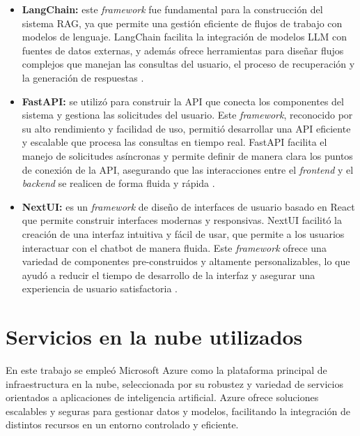 \begin{itemize}
	\item \textbf{LangChain:} este \textit{framework} fue fundamental para la construcción del sistema RAG, ya que permite una gestión 
	eficiente de flujos de trabajo con modelos de lenguaje. LangChain facilita la integración de modelos LLM con fuentes de datos externas, 
	y además ofrece herramientas para diseñar flujos complejos 
	que manejan las consultas del usuario, el proceso de recuperación y la generación de respuestas \citep{website:langchain}.
	\item \textbf{FastAPI:} se utilizó para construir la API que conecta los componentes del sistema y gestiona las solicitudes del usuario. 
	Este \textit{framework}, reconocido por su alto rendimiento y facilidad de uso, permitió desarrollar una API eficiente y escalable que procesa 
	las consultas en tiempo real. FastAPI facilita el manejo de solicitudes asíncronas y permite definir de manera clara los puntos 
	de conexión de la API, asegurando que las interacciones entre el \textit{frontend} y el \textit{backend} se 
	realicen de forma fluida y rápida \citep{website:fastapi}.
	\item \textbf{NextUI:} es un \textit{framework} de diseño de interfaces de usuario 
	basado en React que permite construir interfaces modernas y responsivas. NextUI facilitó la creación de una interfaz intuitiva 
	y fácil de usar, que permite a los usuarios interactuar con el chatbot de manera fluida. Este \textit{framework} ofrece una variedad de 
	componentes pre-construidos y altamente personalizables, lo que ayudó a reducir el tiempo de desarrollo de la interfaz y asegurar 
	una experiencia de usuario satisfactoria \citep{website:nextui}.
\end{itemize}

\section{Servicios en la nube utilizados}

En este trabajo se empleó Microsoft Azure \citep{website:azure} como la plataforma principal de infraestructura en la nube, seleccionada por su robustez y 
variedad de servicios orientados a aplicaciones de inteligencia artificial. Azure ofrece soluciones 
escalables y seguras para gestionar datos y modelos, facilitando la integración de distintos recursos en un entorno controlado y eficiente.

